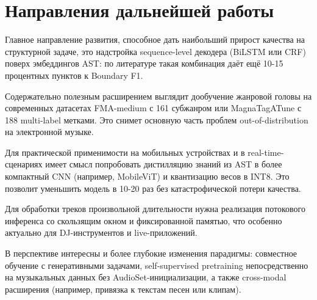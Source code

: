 \section*{Направления дальнейшей работы}

Главное направление развития, способное дать наибольший прирост качества на структурной задаче, это надстройка sequence-level декодера (BiLSTM или CRF) поверх эмбеддингов AST: по литературе такая комбинация даёт ещё 10-15 процентных пунктов к Boundary F1.

Содержательно полезным расширением выглядит дообучение жанровой головы на современных датасетах FMA-medium с 161 субжанром или MagnaTagATune с 188 multi-label метками. Это снимет основную часть проблем out-of-distribution на электронной музыке.

Для практической применимости на мобильных устройствах и в real-time-сценариях имеет смысл попробовать дистилляцию знаний из AST в более компактный CNN (например, MobileViT) и квантизацию весов в INT8. Это позволит уменьшить модель в 10-20 раз без катастрофической потери качества.

Для обработки треков произвольной длительности нужна реализация потокового инференса со скользящим окном и фиксированной памятью, что особенно актуально для DJ-инструментов и live-приложений.

В перспективе интересны и более глубокие изменения парадигмы: совместное обучение с генеративными задачами, self-supervised pretraining непосредственно на музыкальных данных без AudioSet-инициализации, а также cross-modal расширения (например, привязка к текстам песен или клипам).
